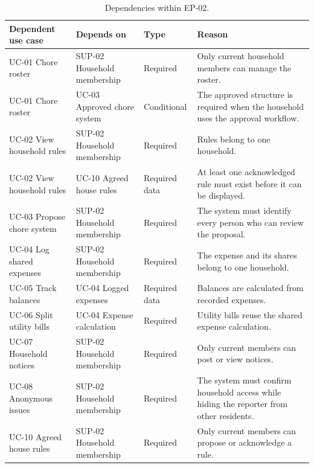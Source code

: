 \documentclass[11pt,a4paper]{article}
\begin{document}
\begin{table}[H]
    \centering
    \small
    \caption{Dependencies within EP-02.}
    \begin{tabularx}{\textwidth}{@{}L{2.9cm}L{3.3cm}L{2.1cm}Y@{}}
        \toprule
        Dependent use case & Depends on & Type & Reason\\
        \midrule
        UC-01 Chore roster & SUP-02 Household membership & Required & Only current household members can manage the roster.\\
        UC-01 Chore roster & UC-03 Approved chore system & Conditional & The approved structure is required when the household uses the approval workflow.\\
        UC-02 View household rules & SUP-02 Household membership & Required & Rules belong to one household.\\
        UC-02 View household rules & UC-10 Agreed house rules & Required data & At least one acknowledged rule must exist before it can be displayed.\\
        UC-03 Propose chore system & SUP-02 Household membership & Required & The system must identify every person who can review the proposal.\\
        UC-04 Log shared expenses & SUP-02 Household membership & Required & The expense and its shares belong to one household.\\
        UC-05 Track balances & UC-04 Logged expenses & Required data & Balances are calculated from recorded expenses.\\
        UC-06 Split utility bills & UC-04 Expense calculation & Required & Utility bills reuse the shared expense calculation.\\
        UC-07 Household notices & SUP-02 Household membership & Required & Only current members can post or view notices.\\
        UC-08 Anonymous issues & SUP-02 Household membership & Required & The system must confirm household access while hiding the reporter from other residents.\\
        UC-10 Agreed house rules & SUP-02 Household membership & Required & Only current members can propose or acknowledge a rule.\\
        \bottomrule
    \end{tabularx}
    \label{tabdepshousehold}
\end{table}
\end{document}
